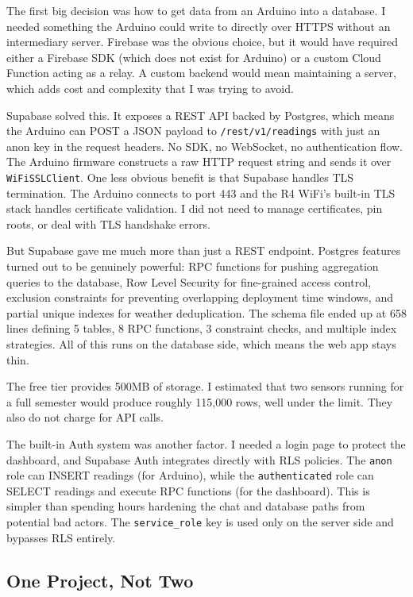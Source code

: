 \documentclass[11pt, letterpaper]{article}
\begin{document}
The first big decision was how to get data from an Arduino into a database. I needed something the Arduino could write to directly over HTTPS without an intermediary server. Firebase was the obvious choice, but it would have required either a Firebase SDK (which does not exist for Arduino) or a custom Cloud Function acting as a relay. A custom backend would mean maintaining a server, which adds cost and complexity that I was trying to avoid.

Supabase solved this. It exposes a REST API backed by Postgres, which means the Arduino can POST a JSON payload to \texttt{/rest/v1/readings} with just an anon key in the request headers. No SDK, no WebSocket, no authentication flow. The Arduino firmware constructs a raw HTTP request string and sends it over \texttt{WiFiSSLClient}. One less obvious benefit is that Supabase handles TLS termination. The Arduino connects to port 443 and the R4 WiFi's built-in TLS stack handles certificate validation. I did not need to manage certificates, pin roots, or deal with TLS handshake errors.

But Supabase gave me much more than just a REST endpoint. Postgres features turned out to be genuinely powerful: RPC functions for pushing aggregation queries to the database, Row Level Security for fine-grained access control, exclusion constraints for preventing overlapping deployment time windows, and partial unique indexes for weather deduplication. The schema file ended up at 658 lines defining 5 tables, 8 RPC functions, 3 constraint checks, and multiple index strategies. All of this runs on the database side, which means the web app stays thin.

The free tier provides 500MB of storage. I estimated that two sensors running for a full semester would produce roughly 115,000 rows, well under the limit. They also do not charge for API calls.

The built-in Auth system was another factor. I needed a login page to protect the dashboard, and Supabase Auth integrates directly with RLS policies. The \texttt{anon} role can INSERT readings (for Arduino), while the \texttt{authenticated} role can SELECT readings and execute RPC functions (for the dashboard). This is simpler than spending hours hardening the chat and database paths from potential bad actors. The \texttt{service\_role} key is used only on the server side and bypasses RLS entirely.

\subsection{One Project, Not Two}
\end{document}
